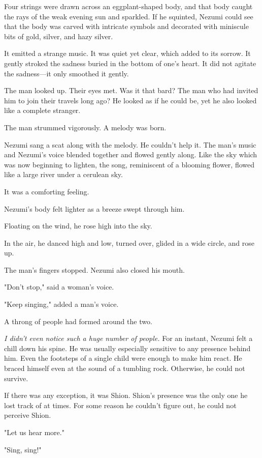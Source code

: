 Four strings were drawn across an eggplant-shaped body, and that body
caught the rays of the weak evening sun and sparkled. If he squinted,
Nezumi could see that the body was carved with intricate symbols and
decorated with miniscule bits of gold, silver, and hazy silver.

It emitted a strange music. It was quiet yet clear, which added to its
sorrow. It gently stroked the sadness buried in the bottom of one's
heart. It did not agitate the sadness---it only smoothed it gently.

The man looked up. Their eyes met. Was it that bard? The man who had
invited him to join their travels long ago? He looked as if he could be,
yet he also looked like a complete stranger.

The man strummed vigorously. A melody was born.

Nezumi sang a scat along with the melody. He couldn't help it. The man's
music and Nezumi's voice blended together and flowed gently along. Like
the sky which was now beginning to lighten, the song, reminiscent of a
blooming flower, flowed like a large river under a cerulean sky.

It was a comforting feeling.

Nezumi's body felt lighter as a breeze swept through him.

Floating on the wind, he rose high into the sky.

In the air, he danced high and low, turned over, glided in a wide
circle, and rose up.

The man's fingers stopped. Nezumi also closed his mouth.

"Don't stop," said a woman's voice.

"Keep singing," added a man's voice.

A throng of people had formed around the two.

\emph{I didn't even notice such a huge number of people.} For an instant,
Nezumi felt a chill down his spine. He was usually especially sensitive
to any presence behind him. Even the footsteps of a single child were
enough to make him react. He braced himself even at the sound of a
tumbling rock. Otherwise, he could not survive.

If there was any exception, it was Shion. Shion's presence was the only
one he lost track of at times. For some reason he couldn't figure out,
he could not perceive Shion.

"Let us hear more."

"Sing, sing!"


